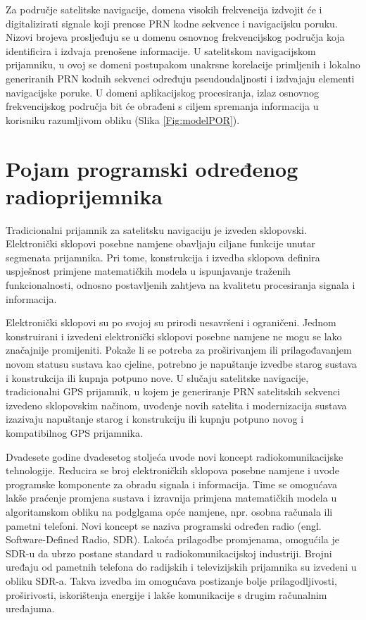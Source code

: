 \documentclass[a4paper,twoside,12pt]{memoir} %
\begin{document}
Za područje satelitske navigacije, domena visokih frekvencija izdvojit će i digitalizirati signale koji prenose PRN kodne sekvence i navigacijsku poruku. Nizovi brojeva prosljeđuju se u domenu osnovnog frekvencijskog područja koja identificira i izdvaja prenošene informacije. U satelitskom navigacijskom prijamniku, u ovoj se domeni postupakom unakrsne korelacije primljenih i lokalno generiranih PRN kodnih sekvenci određuju pseudoudaljnosti i izdvajaju elementi navigacijske poruke. U domeni aplikacijskog procesiranja, izlaz osnovnog frekvencijskog područja bit će obrađeni s ciljem spremanja informacija u korisniku razumljivom obliku (Slika \ref{Fig:modelPOR}).

\section{Pojam programski određenog radioprijemnika}
Tradicionalni prijamnik za satelitsku navigaciju je izveden sklopovski. Elektronički sklopovi posebne namjene obavljaju ciljane funkcije unutar segmenata prijamnika. Pri tome, konstrukcija i izvedba sklopova definira uspješnost primjene matematičkih modela u ispunjavanje traženih funkcionalnosti, odnosno postavljenih zahtjeva na kvalitetu procesiranja signala i informacija.

Elektronički sklopovi su po svojoj su prirodi nesavršeni i ograničeni. Jednom konstruirani i izvedeni elektronički sklopovi posebne namjene ne mogu se lako značajnije promijeniti. Pokaže li se potreba za proširivanjem ili prilagođavanjem novom statusu sustava kao cjeline,
potrebno je napuštanje izvedbe starog sustava i konstrukcija ili kupnja potpuno nove.
U slučaju satelitske navigacije, tradicionalni GPS prijamnik, u kojem je generiranje PRN satelitskih sekvenci izvedeno sklopovskim načinom, uvođenje novih satelita i modernizacija sustava izazivaju napuštanje starog i konstrukciju ili kupnju potpuno novog i kompatibilnog GPS prijamnika.

Dvadesete godine dvadesetog stoljeća uvode novi koncept radiokomunikacijske tehnologije.
Reducira se broj elektroničkih sklopova posebne namjene i uvode programske komponente za obradu signala i informacija. Time se omogućava lakše praćenje promjena sustava i izravnija primjena matematičkih modela u algoritamskom obliku na podglgama opće namjene, npr. osobna računala ili pametni telefoni.
Novi koncept se naziva programski određen radio (engl. Software-Defined Radio, SDR).
Lakoća prilagodbe promjenama, omogućila je SDR-u da ubrzo postane standard u radiokomunikacijskoj industriji.
Brojni uređaju od pametnih telefona do radijskih i televizijskih prijamnika su izvedeni u obliku SDR-a. Takva izvedba im omogućava postizanje bolje prilagodljivosti, proširivosti, iskorištenja energije i lakše komunikacije s drugim računalnim uređajuma. 
\end{document}
